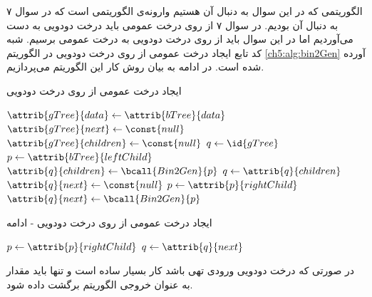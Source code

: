 الگوریتمی که در این سوال به دنبال آن هستیم وارونه‌ی الگوریتمی است که در سوال ۷ به دنبال آن بودیم. در سوال ۷ از روی درخت عمومی باید درخت دودویی به دست می‌آوردیم اما در این سوال باید از روی درخت دودویی به درخت عمومی برسیم. شبه کد تابع ایجاد درخت عمومی از روی درخت دودویی در الگوریتم {\eqref{ch5:alg:bin2Gen}} آورده شده است. در ادامه به بیان روش کار این الگوریتم می‌پردازیم.

\begin{algorithm}[H]
\caption{ایجاد درخت عمومی از روی درخت دودویی}\label{ch5:alg:bin2Gen}
\begin{latin}
\begin{algorithmic}[1]
				\State	\Return {}
		\EndIf
		\State	{}
		\State	$\attrib{gTree}{data} \gets \attrib{bTree}{data}$\label{ch5:alg:ln:oneNodeBTreeBegin}
		\State	$\attrib{gTree}{next} \gets \const{null}$
		\State	$\attrib{gTree}{children} \gets \const{null}$	
		\State	$q \gets \id{gTree}$
		\State	$p \gets \attrib{bTree}{leftChild}$\label{ch5:alg:ln:oneNodeBTreeEnd}
		\label{ch5:alg:ln:Bin2GenRecCasePt1Begin}
				\State	$\attrib{q}{children} \gets \bcall{Bin2Gen}{p}$
				\State	$q \gets \attrib{q}{children}$
				\State	$\attrib{q}{next} \gets \const{null}$
				\State	$p \gets \attrib{p}{rightChild}$
		\EndIf\label{ch5:alg:ln:Bin2GenRecCasePt1End}
		\label{ch5:alg:ln:Bin2GenRecCasePt2Begin}
				\State	$\attrib{q}{next} \gets \bcall{Bin2Gen}{p}$
\end{algorithmic}
\end{latin}
\end{algorithm}

\begin{algorithm}
\caption*{ایجاد درخت عمومی از روی درخت دودویی - ادامه}
\begin{latin}
\begin{algorithmic}[1]
				\State	$p \gets \attrib{p}{rightChild}$
				\State	$q \gets \attrib{q}{next}$
		\EndWhile\label{ch5:alg:ln:Bin2GenRecCasePt2End}
		\State	\Return {}
\EndFunction
\end{algorithmic}
\end{latin}
\end{algorithm}

در صورتی که درخت دودویی ورودی تهی باشد کار بسیار ساده است و تنها باید مقدار {} به عنوان خروجی الگوریتم برگشت داده شود.

